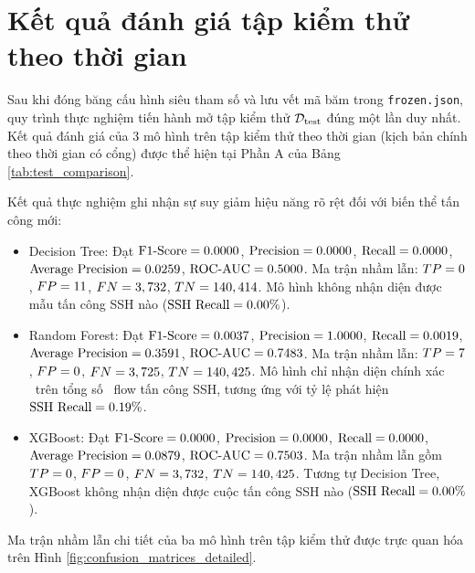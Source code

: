 
\section{Kết quả đánh giá tập kiểm thử theo thời gian}

Sau khi đóng băng cấu hình siêu tham số và lưu vết mã băm trong \texttt{frozen.json}, quy trình thực nghiệm tiến hành mở tập kiểm thử $\mathcal{D}_{\text{test}}$ đúng một lần duy nhất. Kết quả đánh giá của 3 mô hình trên tập kiểm thử theo thời gian (kịch bản chính theo thời gian có cổng) được thể hiện tại Phần A của Bảng \ref{tab:test_comparison}.



Kết quả thực nghiệm ghi nhận sự suy giảm hiệu năng rõ rệt đối với biến thể tấn công mới:
\begin{itemize}
    \item Decision Tree: Đạt $\text{F1-Score} = 0.0000$, $\text{Precision} = 0.0000$, $\text{Recall} = 0.0000$, $\text{Average Precision} = 0.0259$, $\text{ROC-AUC} = 0.5000$. Ma trận nhầm lẫn: $TP = 0$, $FP = 11$, $FN = 3,732$, $TN = 140,414$. Mô hình không nhận diện được mẫu tấn công SSH nào ($\text{SSH Recall} = 0.00\%$).
    \item Random Forest: Đạt $\text{F1-Score} = 0.0037$, $\text{Precision} = 1.0000$, $\text{Recall} = 0.0019$, $\text{Average Precision} = 0.3591$, $\text{ROC-AUC} = 0.7483$. Ma trận nhầm lẫn: $TP = 7$, $FP = 0$, $FN = 3,725$, $TN = 140,425$. Mô hình chỉ nhận diện chính xác \RFTestTP\ trên tổng số \DataTestSSH\ flow tấn công SSH, tương ứng với tỷ lệ phát hiện $\text{SSH Recall} = 0.19\%$.
    \item XGBoost:
    Đạt $\text{F1-Score} = 0.0000$, $\text{Precision} = 0.0000$, $\text{Recall} = 0.0000$, $\text{Average Precision} = 0.0879$, $\text{ROC-AUC} = 0.7503$. Ma trận nhầm lẫn gồm $TP = 0$, $FP = 0$, $FN = 3,732$, $TN = 140,425$. Tương tự Decision Tree, XGBoost không nhận diện được cuộc tấn công SSH nào ($\text{SSH Recall} = 0.00\%$).
\end{itemize}

Ma trận nhầm lẫn chi tiết của ba mô hình trên tập kiểm thử được trực quan hóa trên Hình \ref{fig:confusion_matrices_detailed}.


